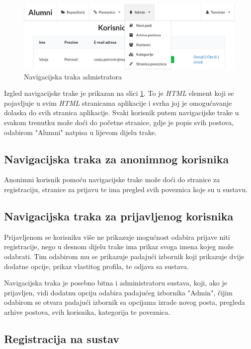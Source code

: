 \documentclass[zavrsni, numeric]{fer}
\begin{document}
\begin{figure}[H]
	\centering
	\includegraphics[width=13cm]{slike/nav-admin.png}
	\caption{Navigacijska traka admistratora}
	\label{fig:nav-admin}
\end{figure}

Izgled navigacijske trake je prikazan na slici \ref{fig:nav-admin}. To je \textit{HTML} element koji se pojavljuje u svim \textit{HTML} stranicama aplikacije i svrha joj je omogućavanje dolaska do svih stranica aplikacije. Svaki korisnik putem navigacijske trake u svakom trenutku može doći do početne stranice, gdje je popis svih postova, odabirom "Alumni" natpisa u lijevom dijelu trake. 

\subsection{Navigacijska traka za anonimnog korisnika}
Anonimni korisnik pomoću navigacijske trake može doći do stranice za registraciju, stranice za prijavu te ima pregled svih poveznica koje su u sustavu. 

\subsection{Navigacijska traka za prijavljenog korisnika}
Prijavljenom se korisniku više ne prikazuje mogućnost odabira prijave niti registracije, nego u desnom dijelu trake ima prikaz svoga imena kojeg može odabrati. Tim odabirom mu se prikazuje padajući izbornik koji prikazuje dvije dodatne opcije, prikaz vlastitog profila, te odjava sa sustava.

Navigacijska traka je posebno bitna i administratoru sustava, koji, ako je prijavljen, vidi dodatnu opciju odabira padajućeg izbornika "Admin", čijim odabirom se otvara padajući izbornik sa opcijama izrade novog posta, pregleda arhive postova, svih korisnika, kategorija te poveznica.

\subsection{Registracija na sustav}
\end{document}
